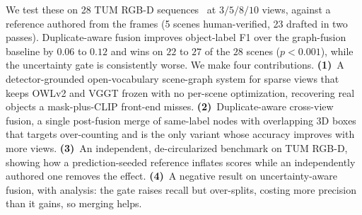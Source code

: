 We test these on 28 TUM RGB-D sequences~\cite{sturm2012tumrgbd} at $3/5/8/10$ views, against a
reference authored from the frames (5 scenes human-verified, 23 drafted in two passes). Duplicate-aware
fusion improves object-label F1 over the graph-fusion baseline by $0.06$ to $0.12$ and wins on $22$ to
$27$ of the $28$ scenes ($p<0.001$), while the uncertainty gate is consistently worse. We make four
contributions. \textbf{(1)}~A detector-grounded open-vocabulary scene-graph system for sparse views that
keeps OWLv2 and VGGT frozen with no per-scene optimization, recovering real
objects a mask-plus-CLIP front-end misses. \textbf{(2)}~Duplicate-aware cross-view fusion, a single
post-fusion merge of same-label nodes with overlapping 3D boxes that targets over-counting and
is the only variant whose accuracy improves with more views. \textbf{(3)}~An independent,
de-circularized benchmark on TUM RGB-D, showing how a prediction-seeded reference inflates scores
while an independently authored one removes the effect. \textbf{(4)}~A negative result on
uncertainty-aware fusion, with analysis: the gate raises recall but
over-splits, costing more precision than it gains, so merging helps.